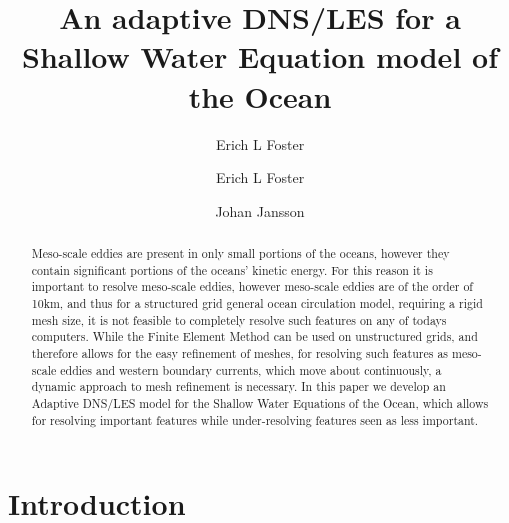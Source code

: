 \documentclass{elsarticle}
\author{Erich L Foster}
\begin{document}
  \begin{frontmatter}
    \author[1]{Erich L Foster}

    \author[1]{Johan Jansson}

    \address[1]{Basque Center for Applied Mathematics, Alameda Mazarredo, 14,
      48009 Bilbao, Basque Country -- Spain}

    \title{An adaptive DNS/LES for a Shallow Water Equation model of the Ocean}

    \begin{abstract}
      Meso-scale eddies are present in only small portions of the oceans,
      however they contain significant portions of the oceans' kinetic energy.
      For this reason it is important to resolve meso-scale eddies, however
      meso-scale eddies are of the order of 10km, and thus for a structured
      grid general ocean circulation model, requiring a rigid mesh size, it is
      not feasible to completely resolve such features on any of todays
      computers.  While the Finite Element Method can be used on unstructured
      grids, and therefore allows for the easy refinement of meshes, for
      resolving such features as meso-scale eddies and western boundary
      currents, which move about continuously, a dynamic approach to mesh
      refinement is necessary. In this paper we develop an Adaptive DNS/LES
      model for the Shallow Water Equations of the Ocean, which allows for
      resolving important features while under-resolving features seen as less
      important.
    \end{abstract}
  \end{frontmatter}

  \section{Introduction} \label{sec:Intro}
  

  
  
\end{document}
